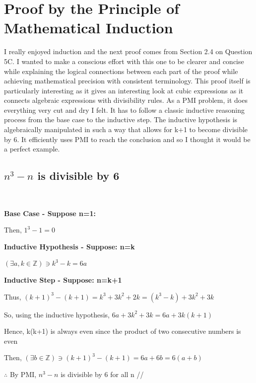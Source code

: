\documentclass{article}
\begin{document}
\newpage
\section{Proof by the Principle of Mathematical Induction}
\justifying
I really enjoyed induction and the next proof comes from Section 2.4 on Question 5C. I wanted to make a conscious effort with this one to be clearer and concise while explaining the logical connections between each part of the proof while achieving mathematical precision with consistent terminology. This proof itself is particularly interesting as it gives an interesting look at cubic expressions as it connects algebraic expressions with divisibility rules. As a PMI problem, it does everything very cut and dry I felt. It has to follow a classic inductive reasoning process from the base case to the inductive step. The inductive hypothesis is algebraically manipulated in such a way that allows for k+1 to become divisible by 6. It efficiently uses PMI to reach the conclusion and so I thought it would be a perfect example.

\begin{center}
\end{center}

\newpage
\subsection{$n^3-n$ is divisible by 6}
\
\begin{center}
\raggedright
\textbf{Base Case - Suppose n=1:}

Then, $1^3-1=0$

\textbf{Inductive Hypothesis - Suppose: n=k}

$(\exists a,k \in \mathbb{Z}) \ni k^3-k=6a$

\textbf{Inductive Step - Suppose: n=k+1}

Thus, $(k+1)^3-(k+1)=k^3+3k^2+2k=(k^3-k)+3k^2+3k$

So, using the inductive hypothesis, $6a+3k^2+3k=6a+3k(k+1)$

Hence, k(k+1) is always even since the product of two consecutive numbers is even

Then, $(\exists b \in \mathbb{Z}) \ni (k+1)^3-(k+1)=6a+6b=6(a+b)$

$\therefore$ By PMI, $n^3-n$ is divisible by 6 for all n   //
\end{center}
\end{document}
